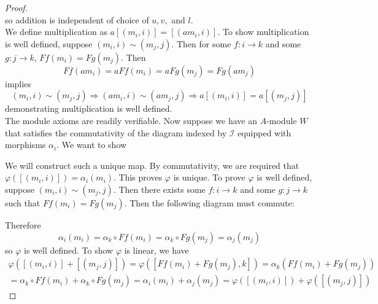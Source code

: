 \documentclass{article}
\newcommand{\fI}{\mathscr{I}}
\begin{document}
\begin{proof}
\[    \]
    so addition is independent of choice of $u,v,$ and $l$.\\
    \newline
    We define multiplication as $a[(m_i,i)]=[(am_i,i)]$. To show multiplication is well defined, suppose $(m_i,i)\sim (m_j,j)$. Then for some $f:i\to k$ and some $g:j\to k$, $Ff(m_i)=Fg(m_j)$. Then
    \[
    Ff(am_i)=aFf(m_i)=aFg(m_j)=Fg(am_j)
    \]
    implies 
    \[
    (m_i,i)\sim(m_j,j)\Rightarrow (am_i,i)\sim (am_j,j)\Rightarrow a[(m_i,i)]=a[(m_j,j)]
    \]
    demonstrating multiplication is well defined.\\
    \newline
    The module axioms are readily verifiable. Now suppose we have an $A$-module $W$ that satisfies the commutativity of the diagram indexed by $\fI$ equipped with morphisms $\alpha_i$. We want to show
    \begin{center}
    \end{center}
    We will construct such a unique map. By commutativity, we are required that $\varphi([(m_i,i)])=\alpha_i(m_i)$. This proves $\varphi$ is unique. To prove $\varphi$ is well defined, suppose $(m_i,i)\sim (m_j,j)$. Then there exists some $f:i\to k$ and some $g:j\to k$ such that $Ff(m_i)=Fg(m_j)$. Then the following diagram must commute:
    \begin{center}
    \end{center}
    Therefore
    \[
    \alpha_i(m_i)=\alpha_k\circ Ff(m_i)=\alpha_k\circ Fg(m_j)=\alpha_j(m_j)
    \]
    so $\varphi$ is well defined. To show $\varphi$ is linear, we have
    \begin{align*}
        \varphi([(m_i,i)]+[(m_j,j)])=\varphi([Ff(m_i)+Fg(m_j),k])=\alpha_k(Ff(m_i)+Fg(m_j))\\
        =\alpha_k\circ Ff(m_i)+\alpha_k\circ Fg(m_j)=\alpha_i(m_i)+\alpha_j(m_j)=\varphi([(m_i,i)])+\varphi([(m_j,j)])

\end{align*}
\end{proof}
\end{document}

